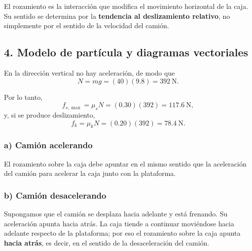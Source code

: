 \documentclass[12pt]{article}
\newcommand{\paso}[2]{%
  \subsection*{\color{AzulFisica}#1. #2}%
}
\begin{document}
El rozamiento es la interacción que modifica el movimiento horizontal de la caja. Su sentido se determina por la \textbf{tendencia al deslizamiento relativo}, no simplemente por el sentido de la velocidad del camión.

\paso{4}{Modelo de partícula y diagramas vectoriales}
En la dirección vertical no hay aceleración, de modo que
\[
N=mg=(40)(9.8)=\SI{392}{\newton}.
\]

Por lo tanto,
\[
f_{s,\max}=\mu_sN=(0.30)(392)=\SI{117.6}{\newton},
\]
y, si se produce deslizamiento,
\[
f_k=\mu_kN=(0.20)(392)=\SI{78.4}{\newton}.
\]

\subsubsection*{a) Camión acelerando}
El rozamiento sobre la caja debe apuntar en el mismo sentido que la aceleración del camión para acelerar la caja junto con la plataforma.

\begin{center}
\end{center}

\subsubsection*{b) Camión desacelerando}
Supongamos que el camión se desplaza hacia adelante y está frenando. Su aceleración apunta hacia atrás. La caja tiende a continuar moviéndose hacia adelante respecto de la plataforma; por eso el rozamiento sobre la caja apunta \textbf{hacia atrás}, es decir, en el sentido de la desaceleración del camión.

\begin{center}
\end{center}
\end{document}
